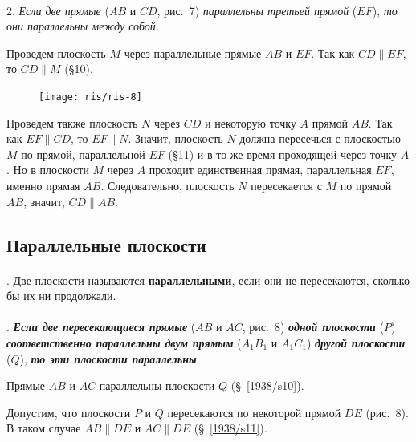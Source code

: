 \documentclass[twoside]{book}
\begin{document}
\paragraph{}\label{1938/s13}
 2.
\emph{Если две прямые} ($AB$ и $CD$, рис.~7) \emph{параллельны третьей прямой} ($EF$), \emph{то они параллельны между собой.}

Проведем плоскость $M$ через параллельные прямые $AB$ и $EF$.
Так как $CD \parallel EF$, то $CD \parallel M$ (§10).

\begin{figure}[h!]
\centering
\texttt{[image: ris/ris-8]}
\caption{}
\end{figure}

Проведем также плоскость $N$ через $CD$ и некоторую точку $A$ прямой $AB$.
Так как $EF\parallel CD$, то $EF\parallel N$.
Значит, плоскость $N$ должна пересечься с плоскостью $M$ по прямой, параллельной $EF$ (§11) и в то же время проходящей через точку $A$.
Но в плоскости $M$ через $A$ проходит единственная прямая, параллельная $EF$, именно прямая $AB$.
Следовательно, плоскость $N$ пересекается с $M$ по прямой $AB$, значит, $CD \parallel AB$.


\subsection*{Параллельные плоскости}

\paragraph{}\label{1938/s14}
. Две плоскости называются \textbf{параллельными}, если они не пересекаются, сколько бы их ни продолжали.

\paragraph{}\label{1938/s15}
. \textbf{\emph{Если две пересекающиеся прямые}} ($AB$ и $AC$, рис.~8) \textbf{\emph{одной плоскости}} ($P$) \textbf{\emph{соответственно параллельны двум прямым}} ($A_1B_1$ и $A_1C_1$) \textbf{\emph{другой плоскости}} ($Q$), \textbf{\emph{то эти плоскости параллельны}}.

Прямые $AB$ и $AC$ параллельны плоскости $Q$ (§~\ref{1938/s10}).

Допустим, что плоскости $P$ и $Q$ пересекаются по некоторой прямой $DE$ (рис.~8).
В таком случае $AB \parallel DE$ и $AC \parallel DE$ (§~\ref{1938/s11}).
\end{document}
